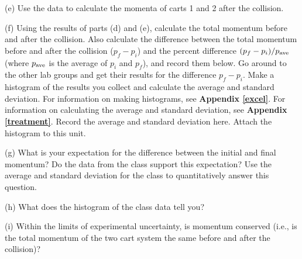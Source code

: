 (e) Use the data to calculate the momenta of carts 1 and 2 after the collision.
\vspace{25mm}

(f) Using the results of parts (d) and (e), calculate the total momentum before and after the collision. 
Also calculate the difference between the total momentum before and after the collision ($p_f - p_i$) and 
the percent difference $(p_f - p_i)/p_{\rm ave}$ (where $p_{\rm ave}$ is the average of $p_i$ and $p_f$), and record them below.
Go around to the other lab groups and get their results for the difference $p_f - p_i$.
Make a histogram of the results you collect and calculate the average and standard deviation.
For information on making histograms, see \textbf{Appendix \ref{excel}}. 
For information on calculating the average and standard deviation, see \textbf{Appendix \ref{treatment}}. Record the average and standard 
deviation here. Attach the histogram to this unit.
\vspace{35mm}

(g) What is your expectation for the difference between the initial and final momentum? 
Do the data from the class support this expectation?  
Use the average and standard deviation for the class to quantitatively answer this question.
\vspace{20mm}

(h) What does the histogram of the class data tell you?
\vspace{20mm}

(i) Within the limits of experimental uncertainty, is momentum 
conserved (i.e., is the total momentum of the two cart system the same before
and after the collision)?

